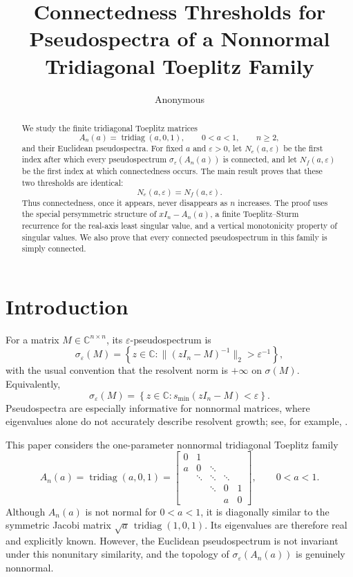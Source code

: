 \documentclass[11pt]{amsart}
\title[Connected pseudospectra of tridiagonal Toeplitz matrices]
{Connectedness Thresholds for Pseudospectra of a Nonnormal Tridiagonal Toeplitz Family}
\author{Anonymous}
\numberwithin{equation}{section}
\DeclareMathOperator{\tridiag}{tridiag}
\newcommand{\C}{\mathbb C}
\newcommand{\eps}{\varepsilon}
\begin{document}
\begin{abstract}
We study the finite tridiagonal Toeplitz matrices
\[
A_n(a)=\tridiag(a,0,1),\qquad 0<a<1,\qquad n\ge2,
\]
and their Euclidean pseudospectra.  For fixed \(a\) and \(\eps>0\), let \(N_e(a,\eps)\) be the first index after which every pseudospectrum \(\sigma_\eps(A_n(a))\) is connected, and let \(N_f(a,\eps)\) be the first index at which connectedness occurs.  The main result proves that these two thresholds are identical:
\[
N_e(a,\eps)=N_f(a,\eps).
\]
Thus connectedness, once it appears, never disappears as \(n\) increases.  The proof uses the special persymmetric structure of \(xI_n-A_n(a)\), a finite Toeplitz--Sturm recurrence for the real-axis least singular value, and a vertical monotonicity property of singular values.  We also prove that every connected pseudospectrum in this family is simply connected.
\end{abstract}

\maketitle

\section{Introduction}

For a matrix \(M\in\C^{n\times n}\), its \(\eps\)-pseudospectrum is
\[
\sigma_\eps(M)
=
\left\{
z\in\C:\|(zI_n-M)^{-1}\|_2>\eps^{-1}
\right\},
\]
with the usual convention that the resolvent norm is \(+\infty\) on \(\sigma(M)\).  Equivalently,
\[
\sigma_\eps(M)
=
\left\{
z\in\C:s_{\min}(zI_n-M)<\eps
\right\}.
\]
Pseudospectra are especially informative for nonnormal matrices, where eigenvalues alone do not accurately describe resolvent growth; see, for example, \cite{Trefethen1997,TrefethenEmbree2005}.

This paper considers the one-parameter nonnormal tridiagonal Toeplitz family
\[
A_n(a)
=
\tridiag(a,0,1)
=
\begin{bmatrix}
0 & 1 \\
a & 0 & \ddots \\
& \ddots & \ddots & \ddots \\
&& \ddots & 0 & 1 \\
&&& a & 0
\end{bmatrix},
\qquad 0<a<1.
\]
Although \(A_n(a)\) is not normal for \(0<a<1\), it is diagonally similar to the symmetric Jacobi matrix \(\sqrt a\,\tridiag(1,0,1)\).  Its eigenvalues are therefore real and explicitly known.  However, the Euclidean pseudospectrum is not invariant under this nonunitary similarity, and the topology of \(\sigma_\eps(A_n(a))\) is genuinely nonnormal.
\end{document}
